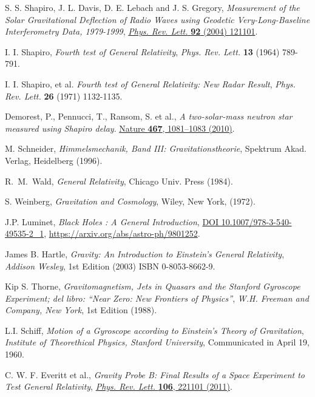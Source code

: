 \begin{thebibliography}{99}
 S. S. Shapiro, J. L. Davis, D. E. Lebach and J. S. Gregory,  \textit{Measurement of the Solar Gravitational Deflection of Radio Waves using Geodetic Very-Long-Baseline Interferometry Data, 1979-1999}, \href{http://link.aps.org/doi/10.1103/PhysRevLett.92.121101
}{  \textsl{Phys. Rev. Lett.}   \textbf{92} (2004) 121101}.

 I. I. Shapiro,   \textit{Fourth test of General Relativity},   \textsl{Phys. Rev. Lett.}   \textbf{13} (1964) 789-791.

 I. I. Shapiro, et al.  \textit{Fourth test of General Relativity: New Radar Result},   \textsl{Phys. Rev. Lett.}   \textbf{26} (1971) 1132-1135.

 Demorest, P., Pennucci, T., Ransom, S. et al., \textit{A two-solar-mass neutron star measured using Shapiro delay}. \href{https://doi.org/10.1038/nature09466}{Nature \textbf{467}, 1081–1083 (2010)}.

M. Schneider,  \textit{Himmelsmechanik, Band III:
Gravitationstheorie}, Spektrum Akad. Verlag, Heidelberg (1996).

 R.~M.~Wald,  \textit{General Relativity},  Chicago Univ. Press (1984).

 S. Weinberg,  \textit{Gravitation and Cosmology}, Wiley, New
York, (1972).

 J.P. Luminet,  \textit{Black Holes : A General Introduction}, \href{http://dx.doi.org/10.1007/978-3-540-49535-2\_1}{DOI 10.1007/978-3-540-49535-2\_1}, \url{https://arxiv.org/abs/astro-ph/9801252}.






James B. Hartle,  \textit{Gravity: An Introduction to Einstein's General Relativity},
  \textsl{Addison Wesley}, 1st Edition (2003) ISBN 0-8053-8662-9.

Kip S. Thorne,  \textit{Gravitomagnetism, Jets in Quasars and the Stanford Gyroscope Experiment; del libro: ``Near Zero: New Frontiers of Physics''},
  \textsl{W.H. Freeman and Company, New York}, 1st Edition (1988).

L.I. Schiff,  \textit{Motion of a Gyroscope according to Einstein's Theory of Gravitation},
  \textsl{Institute of Theorethical Physics, Stanford University}, Communicated in April 19, 1960.



C. W. F. Everitt et al.,  \textit{Gravity Probe B: Final Results of a Space Experiment to Test General Relativity}, \href{http://dx.doi.org/10.1103/PhysRevLett.106.221101}{ \textit{Phys. Rev. Lett.}   \textbf{106}, 221101 (2011)}.


\end{thebibliography}
